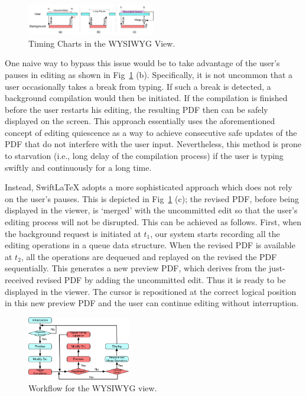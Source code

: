 \documentclass[sigconf]{acmart}
\begin{document}
\begin{figure}[t]
\begin{center}
\includegraphics[width=0.5\textwidth]{figure/timechart}
\caption{Timing Charts in the WYSIWYG View.}
\label{fig:timingchart}
\end{center}
\end{figure}

One naive way to bypass this issue would be to take advantage of the user's pauses in editing as shown in Fig~\ref{fig:timingchart} (b). 
Specifically, it is not uncommon that a user occasionally takes a break from typing.
If such a break is detected, a background compilation would then be initiated.
If the compilation is finished before the user restarts his editing, the resulting PDF then can be safely displayed on the screen. This approach essentially uses the aforementioned concept of editing quiescence as a way to achieve consecutive safe updates of the PDF that do not interfere with the user input.
Nevertheless, this method is prone to starvation (i.e., long delay of the compilation process) if the user is typing swiftly and continuously for a long time.

Instead, SwiftLaTeX adopts a more sophisticated approach which does not rely on the user's pauses.
This is depicted in Fig~\ref{fig:timingchart} (c); the revised PDF, before being displayed in the viewer, is `merged' with the uncommitted edit so that the user's editing process will not be disrupted.
This can be achieved as follows.  
First, when the background request is initiated at $t_1$, our system starts recording all the editing operations in a queue data structure.
When the revised PDF is available at $t_2$, all the operations are dequeued  and replayed on the revised the PDF sequentially.
This generates a new preview PDF, which derives from the just-received revised PDF by adding the uncommitted edit.
Thus it is ready to be displayed in the viewer. The cursor is repositioned at the correct logical position in this new preview PDF and the user can continue editing without interruption.

\begin{figure}[t]
\begin{center}
\includegraphics[width=0.40\textwidth]{figure/flowchart}
\caption{Workflow for the WYSIWYG view.}
\label{fig:flowchart}
\end{center}
\end{figure}
\end{document}
